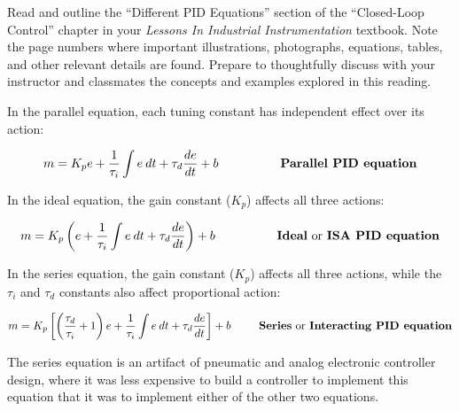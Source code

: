 

Read and outline the ``Different PID Equations'' section of the ``Closed-Loop Control'' chapter in your {\it Lessons In Industrial Instrumentation} textbook.  Note the page numbers where important illustrations, photographs, equations, tables, and other relevant details are found.  Prepare to thoughtfully discuss with your instructor and classmates the concepts and examples explored in this reading.














In the parallel equation, each tuning constant has independent effect over its action:

$$m = K_p e + {1 \over \tau_i} \int e \> dt + \tau_d {de \over dt} + b \hbox{\hskip 50pt {\bf Parallel PID equation}}$$

\vskip 10pt

In the ideal equation, the gain constant ($K_p$) affects all three actions:

$$m = K_p \left( e + {1 \over \tau_i} \int e \> dt + \tau_d {de \over dt} \right) + b \hbox{\hskip 50pt {\bf Ideal} or {\bf ISA PID equation}}$$

\vskip 10pt

In the series equation, the gain constant ($K_p$) affects all three actions, while the $\tau_i$ and $\tau_d$ constants also affect proportional action:

$$m = K_p \left[ \left({\tau_d \over \tau_i} + 1 \right) e + {1 \over \tau_i} \int e \> dt + \tau_d {de \over dt} \right] + b \hbox{\hskip 25pt {\bf Series} or {\bf Interacting PID equation}}$$

The series equation is an artifact of pneumatic and analog electronic controller design, where it was less expensive to build a controller to implement this equation that it was to implement either of the other two equations.








